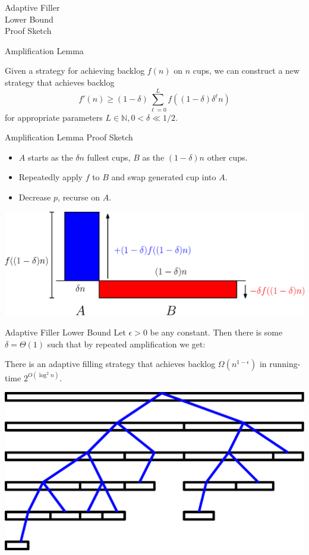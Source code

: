 \documentclass[xcolor=x11names, svgnames, rgb]{beamer}
\begin{document}
\begin{frame}[c]{}
\begin{center}
\Huge Adaptive Filler\\ Lower Bound\\ Proof Sketch
\end{center}
\end{frame}

\begin{frame}[t]{Amplification Lemma}
  \begin{lemma}
    Given a strategy for achieving backlog $f(n)$ on $n$ cups, we can construct a new strategy that achieves backlog 
    $$f'(n) \ge (1-\delta)\sum_{\ell=0}^L f((1-\delta)\delta^\ell n)$$
    for appropriate parameters $L\in\mathbb{N}, 0<\delta\ll 1/2$.
  \end{lemma}
\end{frame}

\begin{frame}[t]{Amplification Lemma Proof Sketch}
  \begin{itemize}
    \item $A$ starts as the $\delta n$ fullest cups, $B$ as the $(1-\delta)n$ other cups.
    \item Repeatedly apply $f$ to $B$ and swap generated cup into $A$. 
    \item Decrease $p$, recurse on $A$.
  \end{itemize} 
  \vspace{0.5cm}
  \includegraphics[width=\linewidth]{amplificationImgs/delta_one_minus_delta.eps}
\end{frame}

\begin{frame}[t]{Adaptive Filler Lower Bound}
  Let $\epsilon > 0$ be any constant. Then there is some $\delta=\Theta(1)$ such that by repeated amplification we get: 
  \begin{theorem}
    There is an adaptive filling strategy that achieves
    backlog $\Omega(n^{1-\epsilon})$  in running-time $2^{O(\log^2 n)}$.
  \end{theorem}
  \vspace{0.5cm}
  \includegraphics[width=0.7\linewidth]{amplificationImgs/quasipoly_cor.eps}
\end{frame}
\end{document}
